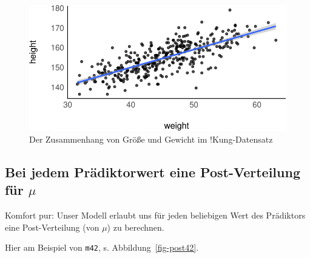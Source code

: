 \documentclass[
  a4paper,
  DIV=11]{scrreprt}
\theoremstyle{definition}
\theoremstyle{remark}
\begin{document}
\begin{figure}[H]

{\centering \includegraphics{./lineare-modelle_files/figure-pdf/fig-kung-zshg-1.pdf}

}

\caption{\label{fig-kung-zshg}Der Zusammenhang von Größe und Gewicht im
!Kung-Datensatz}

\end{figure}

\hypertarget{bei-jedem-pruxe4diktorwert-eine-post-verteilung-fuxfcr-mu}{%
\subsection{\texorpdfstring{Bei jedem Prädiktorwert eine Post-Verteilung
für
\(\mu\)}{Bei jedem Prädiktorwert eine Post-Verteilung für \textbackslash mu}}\label{bei-jedem-pruxe4diktorwert-eine-post-verteilung-fuxfcr-mu}}

Komfort pur: Unser Modell erlaubt uns für jeden beliebigen Wert des
Prädiktors eine Post-Verteilung (von \(\mu\)) zu berechnen.

Hier am Beispiel von \texttt{m42}, s. Abbildung~\ref{fig-post42}.
\end{document}
